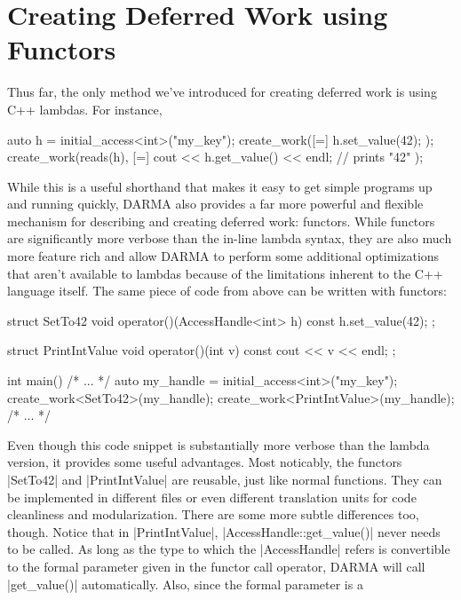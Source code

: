 
\section{Creating Deferred Work using Functors}
\label{sec:functor}

\lstMakeShortInline[style=CppCodeInlineStyle]{\|}

Thus far, the only method we've introduced for creating deferred work is using
C++ lambdas.  For instance,
\begin{CppCodeNumb}
auto h = initial_access<int>("my_key");
create_work([=]{ h.set_value(42); });
create_work(reads(h), [=]{ 
  cout << h.get_value() << endl; // prints "42"
});
\end{CppCodeNumb}
While this is a useful shorthand that makes it easy to get simple programs up
and running quickly, DARMA also provides a far more powerful and flexible
mechanism for describing and creating deferred work:  functors.  While functors
are significantly more verbose than the in-line lambda syntax, they are also
much more feature rich and allow DARMA to perform some additional optimizations
that aren't available to lambdas because of the limitations inherent to the C++
language itself.  The same piece of code from above can be written with
functors:
\begin{CppCodeNumb}
struct SetTo42 {
  void operator()(AccessHandle<int> h) const {
    h.set_value(42);
  }
};

struct PrintIntValue {
  void operator()(int v) const {
    cout << v << endl;
  }
};

int main() {
  /* ... */
  auto my_handle = initial_access<int>("my_key");
  create_work<SetTo42>(my_handle);
  create_work<PrintIntValue>(my_handle);
  /* ... */
}
\end{CppCodeNumb}
Even though this code snippet is substantially more verbose than the lambda
version, it provides some useful advantages.  Most noticably, the functors
|SetTo42| and |PrintIntValue| are reusable, just like normal functions.  They
can be implemented in different files or even different translation units for
code cleanliness and modularization.  There are some more subtle differences
too, though.  Notice that in |PrintIntValue|, |AccessHandle::get_value()| never
needs to be called.  As long as the type to which the |AccessHandle| refers is
convertible to the formal parameter given in the functor call operator, DARMA
will call |get_value()| automatically.  Also, since the formal parameter is a
